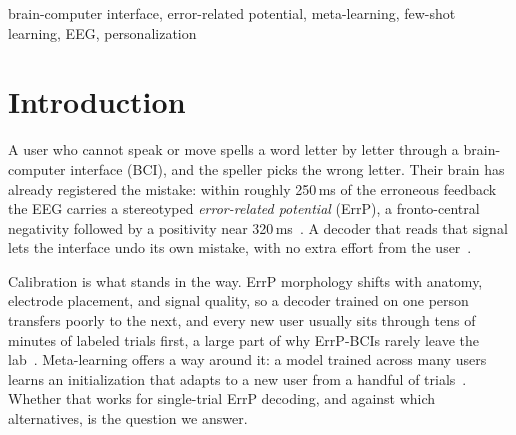 \documentclass[conference,a4paper]{IEEEtran}
\begin{document}
\begin{IEEEkeywords}
brain-computer interface, error-related potential, meta-learning, few-shot
learning, EEG, personalization
\end{IEEEkeywords}

\section{Introduction}
A user who cannot speak or move spells a word letter by letter through a
brain-computer interface (BCI), and the speller picks the wrong letter. Their brain
has already registered the mistake: within roughly 250\,ms of the erroneous feedback
the EEG carries a stereotyped \emph{error-related potential} (ErrP), a fronto-central
negativity followed by a positivity near 320\,ms~\cite{chavarriaga2010learning}. A
decoder that reads that signal lets the interface undo its own mistake, with no extra
effort from the user~\cite{iturrate2015teaching}.

Calibration is what stands in the way. ErrP morphology shifts with anatomy,
electrode placement, and signal quality, so a decoder trained on one person transfers
poorly to the next, and every new user usually sits through tens of minutes of
labeled trials first, a large part of why ErrP-BCIs rarely leave the
lab~\cite{yasemin2023single}. Meta-learning offers a way around it: a model trained
across many users learns an initialization that adapts to a new user from a handful
of trials~\cite{finn2017model}. Whether that works for single-trial ErrP decoding,
and against which alternatives, is the question we answer.
\end{document}
